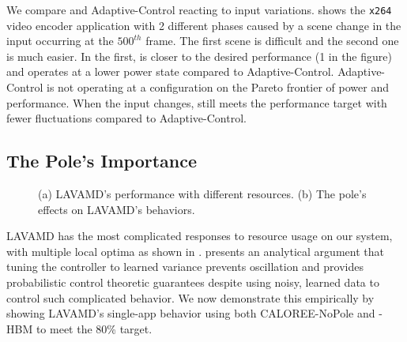 %   
We compare \SYSTEM{} and Adaptive-Control reacting to input
variations.   shows the \texttt{x264}
video encoder application with 2 different phases caused by a scene
change in the input occurring at the $500^{th}$ frame. The first scene
is difficult and the second one is much easier.  In the first,
\SYSTEM{} is closer to the desired performance (1 in the figure) and
operates at a lower power state compared to Adaptive-Control.
Adaptive-Control is not operating at a configuration on the Pareto
frontier of power and performance.  When the input changes, \SYSTEM{}
still meets the performance target with fewer fluctuations compared
to Adaptive-Control.


\subsection{The Pole's Importance}
\begin{figure}
\centering
  \subfloat[]
  {
    
    \label{fig:lavamd-pole}
  }
  \caption{(a) LAVAMD's performance with different resources. (b) The
    pole's effects on LAVAMD's behaviors.}
  \label{fig:lavamd-is-hard}
\end{figure}


LAVAMD has the most complicated responses to resource usage on our
system, with multiple local optima as shown in .
 presents an analytical argument that tuning the
controller to learned variance prevents oscillation and provides
probabilistic control theoretic guarantees despite using noisy,
learned data to control such complicated behavior.  We now demonstrate
this empirically by showing LAVAMD's single-app behavior using both
CALOREE-NoPole and \SYSTEM{}-HBM to meet the 80\% target.

